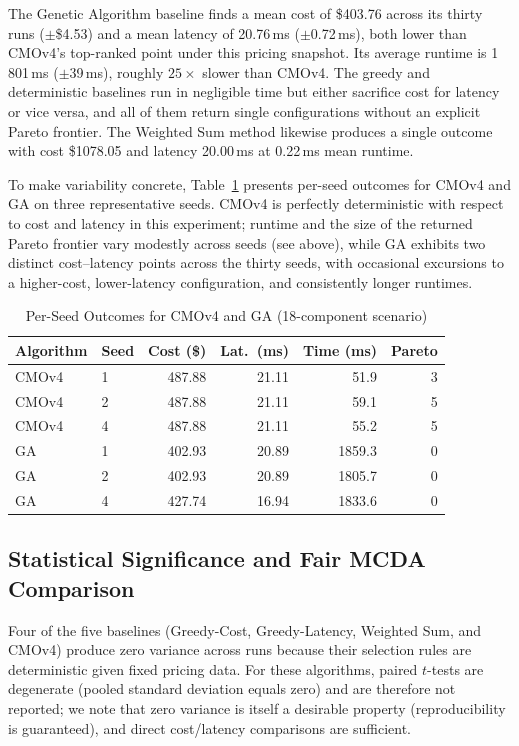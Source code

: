 \documentclass[journal]{IEEEtran}
\newcommand{\cmofour}{CMOv4\xspace}
\begin{document}
The Genetic Algorithm baseline finds a mean cost of \$403.76 across its
thirty runs ($\pm$\$4.53) and a mean latency of 20.76\,ms ($\pm$0.72\,ms),
both lower than \cmofour's top-ranked point under this pricing snapshot. Its
average runtime is 1\,801\,ms ($\pm$39\,ms), roughly $25\times$ slower than
\cmofour. The greedy and deterministic baselines run in negligible time but
either sacrifice cost for latency or vice versa, and all of them return
single configurations without an explicit Pareto frontier. The Weighted Sum
method likewise produces a single outcome with cost \$1078.05 and latency
20.00\,ms at 0.22\,ms mean runtime.

To make variability concrete, Table~\ref{tab:perseed} presents per-seed outcomes
for \cmofour and GA on three representative seeds. \cmofour is perfectly
deterministic with respect to cost and latency in this experiment; runtime and
the size of the returned Pareto frontier vary modestly across seeds (see
above), while GA exhibits two distinct cost--latency points across the thirty
seeds, with occasional excursions to a higher-cost, lower-latency
configuration, and consistently longer runtimes.

\begin{table}[t]
\centering
\caption{Per-Seed Outcomes for CMOv4 and GA (18-component scenario)}
\label{tab:perseed}
\begin{tabular}{@{}llrrrr@{}}
\toprule
Algorithm & Seed & Cost (\$) & Lat.\ (ms) & Time (ms) & Pareto \\
\midrule
\cmofour  & 1    & 487.88 & 21.11 & 51.9  & 3 \\
\cmofour  & 2    & 487.88 & 21.11 & 59.1  & 5 \\
\cmofour  & 4    & 487.88 & 21.11 & 55.2  & 5 \\
GA        & 1    & 402.93 & 20.89 & 1859.3 & 0 \\
GA        & 2    & 402.93 & 20.89 & 1805.7 & 0 \\
GA        & 4    & 427.74 & 16.94 & 1833.6 & 0 \\
\bottomrule
\end{tabular}
\end{table}

\subsection{Statistical Significance and Fair MCDA Comparison}
\label{sec:stats}

Four of the five baselines (Greedy-Cost, Greedy-Latency, Weighted Sum, and
\cmofour) produce zero variance across runs because their selection rules are
deterministic given fixed pricing data. For these algorithms, paired
$t$-tests are degenerate (pooled standard deviation equals zero) and are
therefore not reported; we note that zero variance is itself a desirable
property (reproducibility is guaranteed), and direct cost/latency comparisons
are sufficient.
\end{document}
